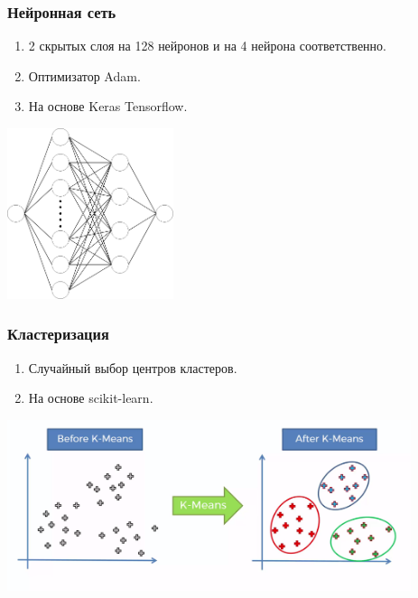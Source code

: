 \documentclass{beamer}
\begin{document}
\begin{frame}
	\frametitle{Нейронная сеть}
	\begin{enumerate}
		\item 2 скрытых слоя на 128 нейронов и на 4 нейрона соответственно.
		\item Оптимизатор Adam.
		\item На основе Keras Tensorflow.
	\end{enumerate}
	\centering
	\includegraphics[height=5cm]{nn.png}
\end{frame}

\begin{frame}
	\frametitle{Кластеризация}
	\begin{enumerate}
		\item Случайный выбор центров кластеров.
		\item На основе scikit-learn.
	\end{enumerate}
	\centering
	\includegraphics[height=5cm]{kmeans.png}
\end{frame}
\end{document}
